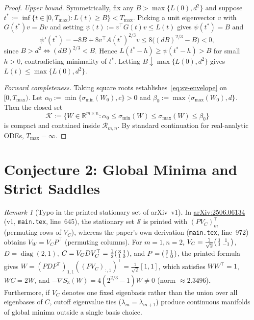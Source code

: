 \documentclass[11pt]{article}
\theoremstyle{plain}
\theoremstyle{definition}
\theoremstyle{remark}
\newtheorem{remark}{Remark}
\DeclareMathOperator{\diag}{diag}
\begin{document}
\begin{proof}
\emph{Upper bound.} Symmetrically, fix any $B > \max\{L(0), d^2\}$ and suppose $t^* := \inf\{t \in [0, T_{\max}) : L(t) \ge B\} < T_{\max}$. Picking a unit eigenvector $v$ with $G(t^*)v = Bv$ and setting $\psi(t) := v^\top G(t) v \le L(t)$ gives $\psi(t^*) = B$ and
\[
\psi'(t^*) = -8B + 8v^\top A(t^*)^{2/3} v \le 8\bigl((dB)^{2/3} - B\bigr) < 0,
\]
since $B > d^2 \iff (dB)^{2/3} < B$. Hence $L(t^* - h) \ge \psi(t^* - h) > B$ for small $h > 0$, contradicting minimality of $t^*$. Letting $B \downarrow \max\{L(0), d^2\}$ gives $L(t) \le \max\{L(0), d^2\}$.

\emph{Forward completeness.} Taking square roots establishes~\eqref{eq:sv-envelope} on $[0, T_{\max})$. Let $\alpha_0 := \min\{\sigma_{\min}(W_0), c\} > 0$ and $\beta_0 := \max\{\sigma_{\max}(W_0), d\}$. Then the closed set
\[
\mathcal{K} := \{W \in \mathbb{R}^{m \times n} : \alpha_0 \le \sigma_{\min}(W) \le \sigma_{\max}(W) \le \beta_0\}
\]
is compact and contained inside $\mathcal{R}_{m,n}$. By standard continuation for real-analytic ODEs, $T_{\max} = \infty$.
\end{proof}

\section{Conjecture 2: Global Minima and Strict Saddles}

\begin{remark}[Typo in the printed stationary set of arXiv~v1]
In \href{https://arxiv.org/abs/2506.06134}{arXiv:2506.06134} (v1, \texttt{main.tex}, line~645), the stationary set $\mathcal{S}$ is printed with $(P V_C)_m^\top$ (permuting rows of $V_C$), whereas the paper's own derivation (\texttt{main.tex}, line~972) obtains $V_W = V_C P^\top$ (permuting columns).
For $m = 1, n = 2$, $V_C = \frac{1}{\sqrt{2}}\begin{psmallmatrix}1 & 1\\ 1 & -1\end{psmallmatrix}$, $D = \diag(2,1)$, $C = V_C D V_C^\top = \frac{1}{2}\begin{psmallmatrix}3 & 1\\ 1 & 3\end{psmallmatrix}$, and $P = \begin{psmallmatrix}0 & 1\\ 1 & 0\end{psmallmatrix}$, the printed formula gives $W = (PDP^\top)_{1,1}((PV_C)_{:,1})^\top = \frac{1}{\sqrt{2}}[1, 1]$, which satisfies $WW^\top = 1$, $WC = 2W$, and $-\nabla S_3(W) = 4(2^{2/3}-1)W \neq 0$ (norm $\approx 2.3496$).
Furthermore, if $V_C$ denotes one fixed eigenbasis rather than the union over all eigenbases of $C$, cutoff eigenvalue ties ($\lambda_m = \lambda_{m+1}$) produce continuous manifolds of global minima outside a single basis choice.
\end{remark}
\end{document}
